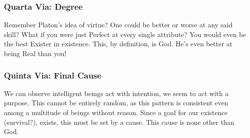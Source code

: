 \documentclass{article}
\begin{document}
	\subsubsection*{Quarta Via: Degree}
	Remember Platon's idea of virtue? One could be better or worse at any said skill? What if you were just Perfect at every single attribute? You would even be the best Exister in existence. This, by definition, is God. He's even better at being Real than you!


	\subsubsection*{Quinta Via: Final Cause}
	We can observe intelligent beings act with intention, we seem to act with a purpose. This cannot be entirely random, as this pattern is consistent even among a multitude of beings without reason. Since a goal for our existence (survival?),  exists, this must be set by a cause. This cause is none other than God.

	\printbibliography{}
\end{document}
